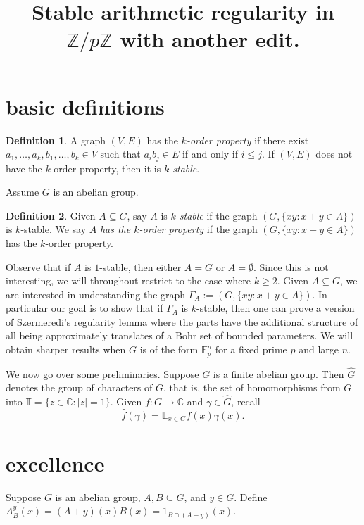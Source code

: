 \documentclass[11pt]{article}
\title{
Stable arithmetic regularity in $\mathbb{Z}/p\mathbb{Z}$ with another edit.
}
\author{
}
\date{}
\theoremstyle{definition}
\newtheorem{definition}{Definition}
\begin{document}
\maketitle


\section{basic definitions}


\begin{definition}
A graph $(V,E)$ has the \emph{$k$-order property} if there exist $a_1,\ldots, a_k,b_1,\ldots, b_k\in V$ such that $a_ib_j\in E$ if and only if $i\leq j$. If $(V,E)$ does not have the $k$-order property, then it is \emph{$k$-stable}.
\end{definition}

Assume $G$ is an abelian group.  
\begin{definition}
Given $A\subseteq G$, say $A$ is \emph{$k$-stable} if the graph $(G,\{xy: x+y\in A\})$ is $k$-stable.  We say $A$ \emph{has the $k$-order property} if the graph $(G,\{xy: x+y\in A\})$ has the $k$-order property.
\end{definition}

Observe that if $A$ is $1$-stable, then either $A=G$ or $A=\emptyset$.  Since this is not interesting, we will throughout restrict to the case where $k\geq 2$. Given $A\subseteq G$, we are interested in understanding the graph $\Gamma_A:=(G,\{xy: x+y\in A\})$.  In particular our goal is to show that if $\Gamma_A$ is $k$-stable, then one can prove a version of Szermeredi's regularity lemma where the parts have the additional structure of all being approximately translates of a Bohr set of bounded parameters.  We will obtain sharper results when $G$ is of the form $\mathbb{F}_p^n$ for a fixed prime $p$ and large $n$.  

We now go over some preliminaries. Suppose $G$ is a finite abelian group.  Then $\widehat{G}$ denotes the group of characters of $G$, that is, the set of homomorphisms from $G$ into $\mathbb{T}=\{z\in \mathbb{C}: |z|=1\}$.  Given $f:G\rightarrow \mathbb{C}$ and $\gamma\in \widehat{G}$, recall 
$$
\widehat{f}(\gamma)=\mathbb{E}_{x\in G} f(x)\gamma(x).
$$



\section{excellence}
Suppose $G$ is an abelian group, $A, B\subseteq G$, and $y\in G$.  Define $A^{y}_B(x)=(A+y)(x)B(x)=1_{B\cap (A+y)}(x)$. 
\end{document}
